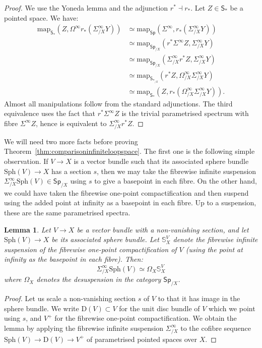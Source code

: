 \documentclass[a4paper]{amsart}
\newcommand{\bS}{\mathbb S}
\newcommand\map{\mathrm{map}}
\newcommand{\Sph}{\mathrm{Sph}}
\theoremstyle{plain}
\newtheorem{lemma}[theorem]{Lemma}
\theoremstyle{definition}
\newcommand{\catS}{\mathsf{S}}
\newcommand{\catSp}{\mathsf{Sp}}
\begin{document}
\begin{proof}
We use the Yoneda lemma and the adjunction $r^* \dashv r_*$. Let $Z \in \catS_*$ be a pointed space. We have:
\begin{equation*}
\begin{split}
    \map_{\catS_*}(Z,  \Omega^\infty r_* (\Sigma^\infty_{/X} Y)) &\simeq \map_{\catSp}(\Sigma^\infty, r_* (\Sigma^\infty_{/X} Y)) \\
        &\simeq \map_{\catSp_{/X}}(r^*\Sigma^\infty Z, \Sigma^\infty_{/X} Y) \\
        &\simeq \map_{\catSp_{/X}}(\Sigma^\infty_{/X} r^* Z, \Sigma^\infty_{/X} Y) \\
        &\simeq \map_{\catS_{*_{/X}}}(r^*Z, \Omega^\infty_{/X} \Sigma^\infty_{/X} Y) \\
        &\simeq \map_{\catS_*}(Z, r_*(\Omega^\infty_{/X} \Sigma^\infty_{/X} Y)).
\end{split}
\end{equation*}
Almost all manipulations follow from the standard adjunctions. The third equivalence uses the fact that $r^*\Sigma^\infty Z$ is the trivial parametrised spectrum with fibre $\Sigma^\infty Z$, hence is equivalent to $\Sigma^\infty_{/X} r^* Z$.
\end{proof}

We will need two more facts before proving Theorem~\ref{thm:comparisoninfiniteloopspace}. The first one is the following simple observation. If $V \to X$ is a vector bundle such that its associated sphere bundle $\Sph(V) \to X$ has a section $s$, then we may take the fibrewise infinite suspension $\Sigma^\infty_{/X}\Sph(V) \in \catSp_{/X}$ using $s$ to give a basepoint in each fibre. On the other hand, we could have taken the fibrewise one-point compactification and then suspend using the added point at infinity as a basepoint in each fibre. Up to a suspension, these are the same parametrised spectra.
\begin{lemma}\label{lemma:spherevscompactification}
Let $V \to X$ be a vector bundle with a non-vanishing section, and let $\Sph(V) \to X$ be its associated sphere bundle. Let $\bS_X^{V}$ denote the fibrewise infinite suspension of the fibrewise one-point compactification of $V$ (using the point at infinity as the basepoint in each fibre). Then:
\[
    \Sigma^\infty_{/X} \Sph(V) \simeq \Omega_X \bS_X^{V}
\]
where $\Omega_X$ denotes the desuspension in the category $\catSp_{/X}$.
\end{lemma}

\begin{proof}
Let us scale a non-vanishing section $s$ of $V$ to that it has image in the sphere bundle. We write $\mathrm{D}(V) \subset V$ for the unit disc bundle of $V$ which we point using $s$, and $V^+$ for the fibrewise one-point compactification. We obtain the lemma by applying the fibrewise infinite suspension $\Sigma^\infty_{/X}$ to the cofibre sequence $\Sph(V) \to \mathrm{D}(V) \to V^+$ of parametrised pointed spaces over $X$.
\end{proof}
\end{document}
